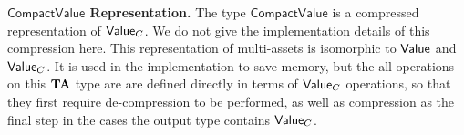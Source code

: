 \noindent \textbf{$\mathsf{CompactValue}$ Representation.}
The type $\mathsf{CompactValue}$ is a compressed representation of $\mathsf{Value}_C$.
We do not give the implementation details of this compression here.
This representation of multi-assets is isomorphic to $\mathsf{Value}$ and $\mathsf{Value}_C$.
It is used in the implementation to save memory, but the all operations on
this $\mathbf{TA}$ type are are defined directly in terms of $\mathsf{Value}_C$ operations,
so that they first require de-compression to be performed, as well as compression
as the final step in the cases the output type contains $\mathsf{Value}_C$.
